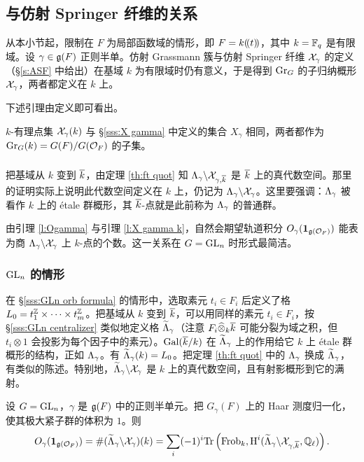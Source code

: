\subsection{与仿射 Springer 纤维的关系}\label{ss:orb ASF}
从本小节起，限制在 $F$ 为局部函数域的情形，即 $F=k(\!(t)\!)$，其中 $k=\mathbb{F}_{q}$ 是有限域。设 $\gamma\in\mathfrak{g}(F)$ 正则半单。仿射 Grassmann 簇与仿射 Springer 纤维 $\mathcal{X}_{\gamma}$ 的定义（\S\ref{s:ASF} 中给出）在基域 $k$ 为有限域时仍有意义，于是得到 $\textup{Gr}_{G}$ 的子归纳概形 $\mathcal{X}_{\gamma}$，两者都定义在 $k$ 上。

下述引理由定义即可看出。

\begin{lemma}\label{l:X gamma k} $k$-有理点集 $\mathcal{X}_{\gamma}(k)$ 与 \S\ref{sss:X gamma} 中定义的集合 $X_{\gamma}$ 相同，两者都作为 $\textup{Gr}_{G}(k)=G(F)/G(\mathcal{O}_{F})$ 的子集。
\end{lemma}

\subsubsection{} 把基域从 $k$ 变到 $\overline{k}$，由定理 \ref{th:ft quot} 知 $\Lambda_{\gamma}\backslash \mathcal{X}_{\gamma,\overline{k}}$ 是 $\overline{k}$ 上的真代数空间。那里的证明实际上说明此代数空间定义在 $k$ 上，仍记为 $\Lambda_{\gamma}\backslash \mathcal{X}_{\gamma}$。这里要强调：$\Lambda_{\gamma}$ 被看作 $k$ 上的 étale 群概形，其 $\overline{k}$-点就是此前称为 $\Lambda_{\gamma}$ 的普通群。

由引理 \ref{l:Ogamma} 与引理 \ref{l:X gamma k}，自然会期望轨道积分 $O_{\gamma}(\mathbf{1}_{\mathfrak{g}(\mathcal{O}_{F})})$ 能表为商 $\Lambda_{\gamma}\backslash \mathcal{X}_{\gamma}$ 上 $k$-点的个数。这一关系在 $G=\textup{GL}_{n}$ 时形式最简洁。

\subsubsection{$\textup{GL}_{n}$ 的情形}\label{sss:GLn orb coho}
在 \S\ref{sss:GLn orb formula} 的情形中，选取素元 $t_{i}\in F_{i}$ 后定义了格 $L_{0}=t^{\mathbb{Z}}_{1}\times \cdots\times t^{\mathbb{Z}}_{m}$。把基域从 $k$ 变到 $\overline{k}$，可以用同样的素元 $t_{i}\in F_{i}$，按 \S\ref{sss:GLn centralizer} 类似地定义格 $\widetilde{\Lambda}_{\gamma}$（注意 $F_{i}\widehat\otimes_{k}\overline{k}$ 可能分裂为域之积，但 $t_{i}\otimes 1$ 会投影为每个因子中的素元）。$\textup{Gal}(\overline{k}/k)$ 在 $\widetilde{\Lambda}_{\gamma}$ 上的作用给它 $k$ 上 étale 群概形的结构，正如 $\Lambda_{\gamma}$。有 $\widetilde{\Lambda}_{\gamma}(k)=L_{0}$。把定理 \ref{th:ft quot} 中的 $\Lambda_{\gamma}$ 换成 $\widetilde{\Lambda}_{\gamma}$，有类似的陈述。特别地，$\widetilde{\Lambda}_{\gamma}\backslash\mathcal{X}_{\gamma}$ 是 $k$ 上的真代数空间，且有射影概形到它的满射。

\begin{theorem}\label{th:GLn orb} 设 $G=\textup{GL}_{n}$，$\gamma$ 是 $\mathfrak{g}(F)$ 中的正则半单元。把 $G_{\gamma}(F)$ 上的 Haar 测度归一化，使其极大紧子群的体积为 $1$。则
\begin{equation}\label{GLn orb}
O_{\gamma}(\mathbf{1}_{\mathfrak{g}(\mathcal{O}_{F})})=\#(\widetilde{\Lambda}_{\gamma}\backslash\mathcal{X}_{\gamma})(k)=\sum_{i}(-1)^{i}\textup{Tr}\left(\textup{Frob}_{k}, \textup{H}^{i}({\widetilde{\Lambda}_{\gamma}\backslash\mathcal{X}_{\gamma,\overline{k}},\mathbb{Q}_{\ell}})\right).
\end{equation}
\end{theorem}


